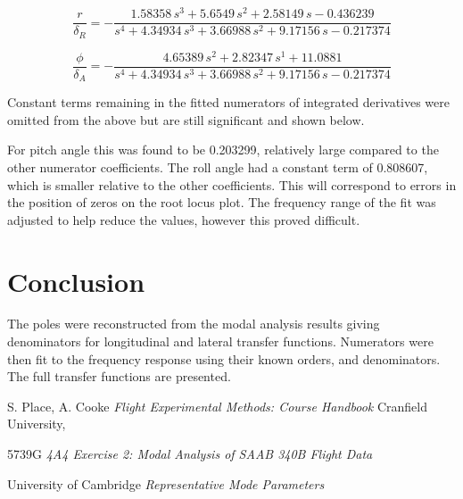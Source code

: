 \documentclass{article}
\begin{document}
\begin{equation}
    \frac{r}{\delta_R} =
    -\frac{1.58358\,s^3+5.6549\,s^2+2.58149\,s-0.436239}{s^4+4.34934\,s^3+3.66988\,s^2+9.17156\,s-0.217374}
\end{equation}

\begin{equation}
    \frac{\phi}{\delta_A} =
    -\frac{4.65389\,s^2+2.82347\,s^1+11.0881}{s^4+4.34934\,s^3+3.66988\,s^2+9.17156\,s-0.217374}
\end{equation}

Constant terms remaining in the fitted numerators of integrated derivatives were omitted from the above but are still significant and shown below.

For pitch angle this was found to be 0.203299, relatively large compared to the other numerator coefficients.
The roll angle had a constant term of 0.808607, which is smaller relative to the other coefficients.
This will correspond to errors in the position of zeros on the root locus plot.
The frequency range of the fit was adjusted to help reduce the values, however this proved difficult.


\section{Conclusion}

The poles were reconstructed from the modal analysis results giving denominators for longitudinal and lateral transfer functions.
Numerators were then fit to the frequency response using their known orders, and denominators.
The full transfer functions are presented.


\begin{thebibliography}{9}

  S. Place, A. Cooke
  \emph{Flight Experimental Methods: Course Handbook}
  Cranfield University,

  5739G
  \emph{4A4 Exercise 2: Modal Analysis of SAAB 340B Flight Data}

  University of Cambridge
  \emph{Representative Mode Parameters}

\end{thebibliography}
\end{document}
